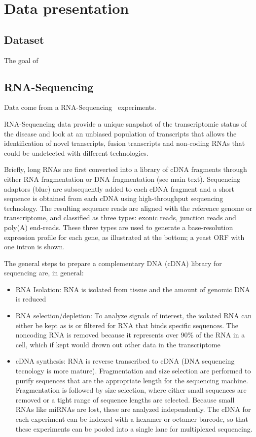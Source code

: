 \chapter{Data presentation}\label{ch:data}
\section{Dataset}\label{sec:dataset}

The goal of ~\cite{Farver2018} ~\cite{Zhou2016} ~\cite{Lancichinetti2015} ~\cite{Martini2017}


\section{RNA-Sequencing}\label{sec:rnaseq}

Data come from a  RNA-Sequencing~\cite{wang2009rna} experiments.
 
RNA-Sequencing data provide a unique snapshot of the transcriptomic status of the disease and look at an unbiased population of transcripts that allows the identification of novel transcripts, fusion transcripts and non-coding RNAs that could be undetected with different technologies.

Briefly, long RNAs are first converted into a library of cDNA fragments through either RNA fragmentation or DNA fragmentation (see main text). Sequencing adaptors (blue) are subsequently added to each cDNA fragment and a short sequence is obtained from each cDNA using high-throughput sequencing technology. The resulting sequence reads are aligned with the reference genome or transcriptome, and classified as three types: exonic reads, junction reads and poly(A) end-reads. These three types are used to generate a base-resolution expression profile for each gene, as illustrated at the bottom; a yeast ORF with one intron is shown.



The general steps to prepare a complementary DNA (cDNA) library for sequencing are, in general:

\begin{itemize}
\item RNA Isolation: RNA is isolated from tissue and the amount of genomic DNA is reduced
\item RNA selection/depletion: To analyze signals of interest, the isolated RNA can either be kept as is or filtered for RNA that binds specific sequences. The noncoding RNA is removed because it represents over 90$\%$ of the RNA in a cell, which if kept would drown out other data in the transcriptome
\item cDNA synthesis: RNA is reverse transcribed to cDNA (DNA sequencing tecnology is more mature). Fragmentation and size selection are performed to purify sequences that are the appropriate length for the sequencing machine.  Fragmentation is followed by size selection, where either small sequences are removed or a tight range of sequence lengths are selected. Because small RNAs like miRNAs are lost, these are analyzed independently. The cDNA for each experiment can be indexed with a hexamer or octamer barcode, so that these experiments can be pooled into a single lane for multiplexed sequencing.
\end{itemize}

